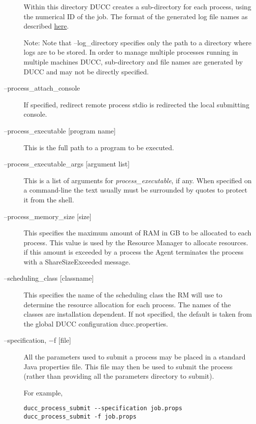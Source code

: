 \begin{description}
          Within this directory DUCC creates a sub-directory for each process, using the numerical 
          ID of the job. The format of the generated log file names as described
          \hyperref[chap:job-logs]{here}.
          
          Note: Note that --log\_directory specifies only the path to a directory where 
          logs are to be stored. In order to manage multiple processes running in multiple 
          machines DUCC, sub-directory and file names are generated by DUCC and may 
          not be directly specified. 

        \item[--process\_attach\_console] If specified, redirect remote process stdio is 
          redirected the local submitting console.
          
        \item[--process\_executable {[program name]}] This is the full path to a program to be
          executed.

        \item[--process\_executable\_args {[argument list]}] This is a list of arguments for
          {\em process\_executable}, if any.   When specified on a command-line the text usually must be
          surrounded by quotes to protect it from the shell.

        \item[--process\_memory\_size {[size]} ] This specifies the maximum amount of RAM in GB to
          be allocated to each process.  This value is used by the Resource Manager to allocate
          resources. if this amount is exceeded by a process the Agent terminates the process with a
          ShareSizeExceeded message.

        \item[--scheduling\_class {[classname]} ] This specifies the name of the scheduling class the
          RM will use to determine the resource allocation for each process. The names of the
          classes are installation dependent. If not specified, the default is taken from the global
          DUCC configuration ducc.properties.

        \item[--specification, $-$f {[file]} ] All the parameters used to submit a process may be placed
          in a standard Java properties file.  This file may then be used to submit the process
          (rather than providing all the parameters directory to submit).
          
          For example, 
\begin{verbatim}
ducc_process_submit --specification job.props 
ducc_process_submit -f job.props 
\end{verbatim}


\end{description}

